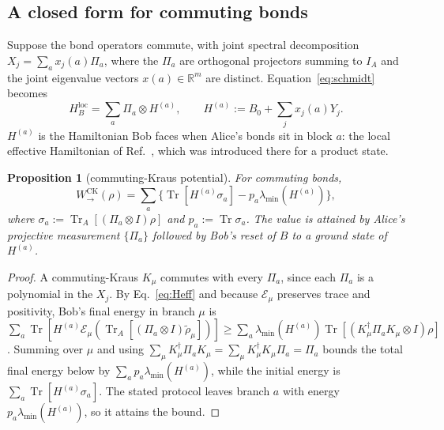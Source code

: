 \documentclass[aps,pra,twocolumn,reprint,superscriptaddress,nofootinbib,floatfix]{revtex4-2}
\theoremstyle{plain}
\newtheorem{proposition}{Proposition}
\theoremstyle{remark}
\newcommand{\Tr}{\operatorname{Tr}}
\newcommand{\WCK}{W_{\to}^{\mathrm{CK}}}
\newcommand{\HBl}{H_B^{\mathrm{loc}}}
\newcommand{\E}{\mathcal{E}}
\newcommand{\lmin}{\lambda_{\min}}
\begin{document}
\subsection{A closed form for commuting bonds}

Suppose the bond operators commute, with joint spectral decomposition
$X_j=\sum_a x_j(a)\Pi_a$, where the $\Pi_a$ are orthogonal projectors summing to $I_A$ and
the joint eigenvalue vectors $x(a)\in\mathbb{R}^m$ are distinct. Equation~\eqref{eq:schmidt}
becomes
\begin{equation}
\HBl=\sum_a\Pi_a\otimes H^{(a)} ,\qquad H^{(a)}:=B_0+\sum_j x_j(a)Y_j .
\label{eq:Heff}
\end{equation}
$H^{(a)}$ is the Hamiltonian Bob faces when Alice's bonds sit in block $a$: the local
effective Hamiltonian of Ref.~\cite{Xie2025}, which was introduced there for a product state.

\begin{proposition}[commuting-Kraus potential]
\label{prop:closed}
For commuting bonds,
\begin{equation}
\WCK(\rho)=\sum_a\Big\{\Tr[H^{(a)}\sigma_a]-p_a\lmin(H^{(a)})\Big\},
\label{eq:closed}
\end{equation}
where $\sigma_a:=\Tr_A[(\Pi_a\otimes I)\rho]$ and $p_a:=\Tr\sigma_a$. The value is attained
by Alice's projective measurement $\{\Pi_a\}$ followed by Bob's reset of $B$ to a ground
state of $H^{(a)}$.
\end{proposition}

\begin{proof}
A commuting-Kraus $K_\mu$ commutes with every $\Pi_a$, since each $\Pi_a$ is a polynomial in
the $X_j$. By Eq.~\eqref{eq:Heff} and because $\E_\mu$ preserves trace and positivity, Bob's
final energy in branch $\mu$ is
$\sum_a\Tr[H^{(a)}\E_\mu(\Tr_A[(\Pi_a\otimes I)\tilde\rho_\mu])]\ge
\sum_a\lmin(H^{(a)})\Tr[(K_\mu^\dagger\Pi_aK_\mu\otimes I)\rho]$. Summing over $\mu$ and using
$\sum_\mu K_\mu^\dagger\Pi_aK_\mu=\sum_\mu K_\mu^\dagger K_\mu\Pi_a=\Pi_a$ bounds the total
final energy below by $\sum_ap_a\lmin(H^{(a)})$, while the initial energy is
$\sum_a\Tr[H^{(a)}\sigma_a]$. The stated protocol leaves branch $a$ with energy
$p_a\lmin(H^{(a)})$, so it attains the bound.
\end{proof}
\end{document}
